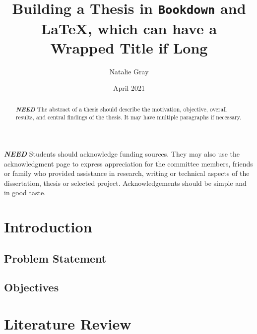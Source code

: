 \documentclass[fancy, masters,twoside]{byuthesis}
\title{Building a Thesis in \texttt{Bookdown} and LaTeX, which can have a\\
Wrapped Title if Long}
\author{Natalie Gray}
\date{April 2021}
\begin{document}
	\frontmatter

	\titlepage
	\cleardoublepage

	\customtitlepage
	\cleardoublepage


    \begin{abstract}
  \textbf{\emph{NEED}} The abstract of a thesis should describe the
  motivation, objective, overall results, and central findings of the thesis.
  It may have multiple paragraphs if necessary.
  \end{abstract}
  	\cleardoublepage


    \begin{acknowledgments}
  \textbf{\emph{NEED}} Students should acknowledge funding sources. They may also use the
  acknowledgment page to express appreciation for the committee members, friends
  or family who provided assistance in research, writing or technical aspects of
  the dissertation, thesis or selected project. Acknowledgements should be simple
  and in good taste.
  \end{acknowledgments}
  	\cleardoublepage

	\tableofcontents*
	\cleardoublepage

	\listoffigures
	\cleardoublepage

	\listoftables
	\cleardoublepage

	
	\cleardoublepage

	\mainmatter

\hypertarget{introduction}{%
\chapter{Introduction}\label{introduction}}

\hypertarget{problem-statement}{%
\section{Problem Statement}\label{problem-statement}}

\hypertarget{objectives}{%
\section{Objectives}\label{objectives}}

\hypertarget{literature-review}{%
\chapter{Literature Review}\label{literature-review}}
\end{document}
